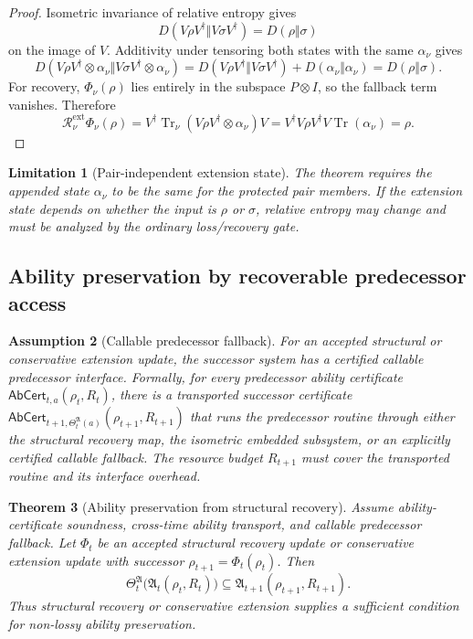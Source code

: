 \documentclass[11pt]{article}
\newtheorem{theorem}{Theorem}[section]
\newtheorem{assumption}[theorem]{Assumption}
\newtheorem{limitation}[theorem]{Limitation}
\newcommand{\Rcal}{\mathcal{R}}
\newcommand{\Tr}{\operatorname{Tr}}
\newcommand{\1}{\mathbf{1}}
\begin{document}
\begin{proof}
Isometric invariance of relative entropy gives
\[
D(V\rho V^\dagger\Vert V\sigma V^\dagger)=D(\rho\Vert\sigma)
\]
on the image of \(V\).  Additivity under tensoring both states with the same \(\alpha_\nu\) gives
\[
D(V\rho V^\dagger\otimes\alpha_\nu\Vert V\sigma V^\dagger\otimes\alpha_\nu)
=
D(V\rho V^\dagger\Vert V\sigma V^\dagger)+D(\alpha_\nu\Vert\alpha_\nu)
=D(\rho\Vert\sigma).
\]
For recovery, \(\Phi_\nu(\rho)\) lies entirely in the subspace \(P\otimes I\), so the fallback term vanishes.  Therefore
\[
\Rcal_\nu^{\mathrm{ext}}\Phi_\nu(\rho)
=
V^\dagger\Tr_\nu(V\rho V^\dagger\otimes\alpha_\nu)V
=V^\dagger V\rho V^\dagger V\Tr(\alpha_\nu)=\rho.
\]
\end{proof}

\begin{limitation}[Pair-independent extension state]
The theorem requires the appended state \(\alpha_\nu\) to be the same for the protected pair members.  If the extension state depends on whether the input is \(\rho\) or \(\sigma\), relative entropy may change and must be analyzed by the ordinary loss/recovery gate.
\end{limitation}

\subsection{Ability preservation by recoverable predecessor access}

\begin{assumption}[Callable predecessor fallback]
\label{ass:callable_predecessor_fallback}
For an accepted structural or conservative extension update, the successor system has a certified callable predecessor interface.  Formally, for every predecessor ability certificate \(\mathsf{AbCert}_{t,a}(\rho_t,R_t)\), there is a transported successor certificate \(\mathsf{AbCert}_{t+1,\Theta_t^{\mathfrak A}(a)}(\rho_{t+1},R_{t+1})\) that runs the predecessor routine through either the structural recovery map, the isometric embedded subsystem, or an explicitly certified callable fallback.  The resource budget \(R_{t+1}\) must cover the transported routine and its interface overhead.
\end{assumption}

\begin{theorem}[Ability preservation from structural recovery]
\label{thm:ability_preservation_from_structural_recovery}
Assume ability-certificate soundness, cross-time ability transport, and callable predecessor fallback.  Let \(\Phi_t\) be an accepted structural recovery update or conservative extension update with successor \(\rho_{t+1}=\Phi_t(\rho_t)\).  Then
\[
\Theta_t^{\mathfrak A}\bigl(\mathfrak A_t(\rho_t,R_t)\bigr)
\subseteq
\mathfrak A_{t+1}(\rho_{t+1},R_{t+1}).
\]
Thus structural recovery or conservative extension supplies a sufficient condition for non-lossy ability preservation.
\end{theorem}
\end{document}
